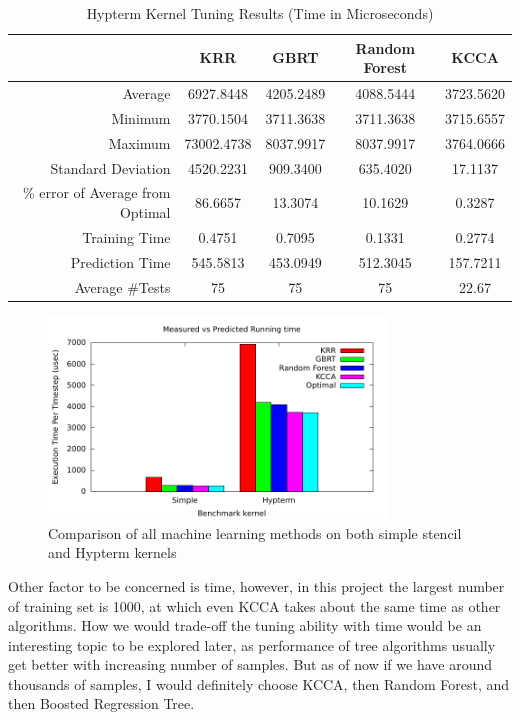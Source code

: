 \begin{table}[ht]
\caption{Hypterm Kernel Tuning Results (Time in Microseconds)}
\center
\begin{tabular}{r c c c c}
\hline
 & KRR	& GBRT	& Random Forest	& KCCA \\
\hline\hline
Average	& 6927.8448	& 4205.2489	& 4088.5444	& 3723.5620 \\
Minimum	& 3770.1504	& 3711.3638	& 3711.3638	& 3715.6557 \\
Maximum	& 73002.4738	& 8037.9917	& 8037.9917	& 3764.0666 \\
Standard Deviation	& 4520.2231	& 909.3400	& 635.4020	& 17.1137 \\
\% error of Average from Optimal	& 86.6657	& 13.3074	& 10.1629	& 0.3287 \\
\cline{2-5}
Training Time & 0.4751 & 0.7095 & 0.1331 & 0.2774 \\
Prediction Time & 545.5813 & 453.0949 & 512.3045 & 157.7211 \\
Average \#Tests & 75 & 75 & 75 & 22.67 \\
\hline
\end{tabular}
\label{table:simple}
\end{table}

\begin{figure}[h]
\centering
\includegraphics[width=0.8\textwidth]{./images/compare_all.pdf}
\caption{Comparison of all machine learning methods on both simple stencil and Hypterm kernels}
\label{fig:compare_all}
\end{figure}

Other factor to be concerned is time, however, in this project the largest number of training set is 1000, at which even KCCA takes about the same time as other algorithms. How we would trade-off the tuning ability with time would be an interesting topic to be explored later, as performance of tree algorithms usually get better with increasing number of samples. But as of now if we have around thousands of samples, I would definitely choose KCCA, then Random Forest, and then Boosted Regression Tree.

